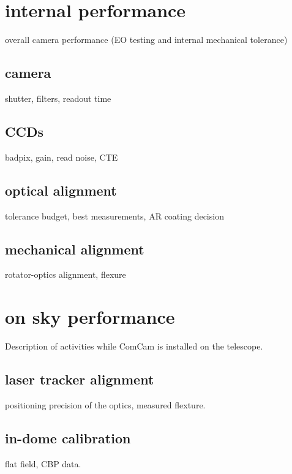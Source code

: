 
\section{internal performance}

overall camera performance (EO testing and internal mechanical tolerance)

\subsection{camera}

shutter, filters, readout time

\subsection{CCDs}

badpix, gain, read noise, CTE

\subsection{optical alignment}

tolerance budget, best measurements, AR coating decision

\subsection{mechanical alignment}

rotator-optics alignment, flexure

\section{on sky performance}

Description of activities while ComCam is installed on the telescope.

\subsection{laser tracker alignment}

positioning precision of the optics, measured flexture.

\subsection{in-dome calibration}

flat field, CBP data.

